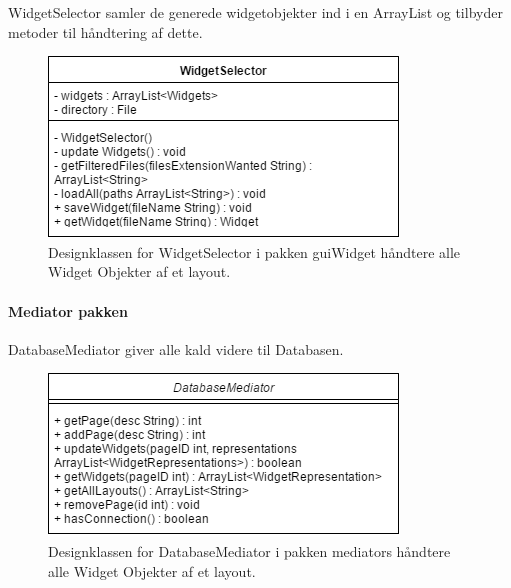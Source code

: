 WidgetSelector samler de generede widgetobjekter ind i en ArrayList og tilbyder metoder til håndtering af dette.
      \begin{figure}[H]
      \includegraphics[width=\linewidth]{elaborationsdokumentet/figurer/design/designklasser/Designklasse-WidgetSelector.png}
      \caption{Designklassen for WidgetSelector i pakken guiWidget håndtere alle Widget Objekter af et layout.}
      \label{Designklasse-WidgetSelector}
  \end{figure}

\FloatBarrier

\paragraph{Mediator pakken}

DatabaseMediator giver alle kald videre til Databasen.

      \begin{figure}[H]
      \includegraphics[width=\linewidth]{elaborationsdokumentet/figurer/design/designklasser/Designklasse-DatabaseMediator.png}
      \caption{Designklassen for DatabaseMediator i pakken mediators håndtere alle Widget Objekter af et layout.}
      \label{Designklasse-DatabaseMediator}
  \end{figure}
  
